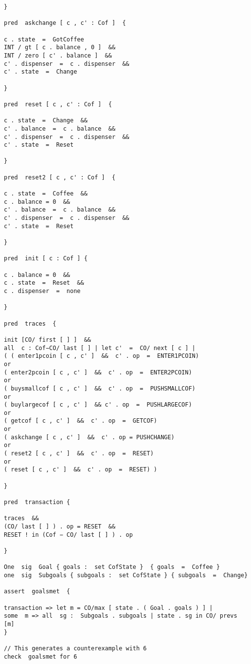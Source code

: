 \documentclass[a4paper,12pt]{extarticle}
\begin{document}
\begin{verbatim}
}

pred  askchange [ c , c' : Cof ]  {

c . state  =  GotCoffee
INT / gt [ c . balance , 0 ]  &&
INT / zero [ c' . balance ]  &&
c' . dispenser  =  c . dispenser  &&
c' . state  =  Change

}

pred  reset [ c , c' : Cof ]  {

c . state  =  Change  &&
c' . balance  =  c . balance  &&
c' . dispenser  =  c . dispenser  &&
c' . state  =  Reset

}

pred  reset2 [ c , c' : Cof ]  {

c . state  =  Coffee  &&
c . balance = 0  &&
c' . balance  =  c . balance  &&
c' . dispenser  =  c . dispenser  &&
c' . state  =  Reset

}

pred  init [ c : Cof ] {

c . balance = 0  &&
c . state  =  Reset  &&
c . dispenser  =  none

}

pred  traces  {

init [CO/ first [ ] ]  &&
all  c : Cof−CO/ last [ ] | let c'  =  CO/ next [ c ] |
( ( enter1pcoin [ c , c' ]  &&  c' . op  =  ENTER1PCOIN)
or
( enter2pcoin [ c , c' ]  &&  c' . op  =  ENTER2PCOIN)
or
( buysmallcof [ c , c' ]  &&  c' . op  =  PUSHSMALLCOF)
or
( buylargecof [ c , c' ]  && c' . op  =  PUSHLARGECOF)
or
( getcof [ c , c' ]  &&  c' . op  =  GETCOF)
or
( askchange [ c , c' ]  &&  c' . op = PUSHCHANGE)
or
( reset2 [ c , c' ]  &&  c' . op  =  RESET)
or
( reset [ c , c' ]  &&  c' . op  =  RESET) )

}

pred  transaction {

traces  &&
(CO/ last [ ] ) . op = RESET  &&
RESET ! in (Cof − CO/ last [ ] ) . op

}

One  sig  Goal { goals :  set CofState }  { goals  =  Coffee }
one  sig  Subgoals { subgoals :  set CofState } { subgoals  =  Change}

assert  goalsmet  {

transaction => let m = CO/max [ state . ( Goal . goals ) ] |
some  m => all  sg :  Subgoals . subgoals | state . sg in CO/ prevs [m]
}

// This generates a counterexample with 6
check  goalsmet for 6

\end{verbatim}
\newpage
\end{document}
